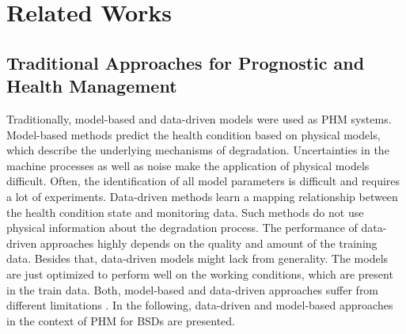
\chapter{Related Works}\label{chapter:related_works}


\section{Traditional Approaches for Prognostic and Health Management}

Traditionally, model-based and data-driven models were used as PHM systems. Model-based methods predict the health condition based on physical models, which describe the underlying mechanisms of degradation. Uncertainties in the machine processes as well as noise make the application of physical models difficult. Often, the identification of all model parameters is difficult and requires a lot of experiments. Data-driven methods learn a mapping relationship between the health condition state and monitoring data. Such methods do not use physical information about the degradation process. The performance of data-driven approaches highly depends on the quality and amount of the training data. Besides that, data-driven models might lack from generality. The models are just optimized to perform well on the working conditions, which are present in the train data. Both, model-based and data-driven approaches suffer from different limitations \cite{DENG2020}. In the following, data-driven and model-based approaches in the context of PHM for BSDs are presented. 

